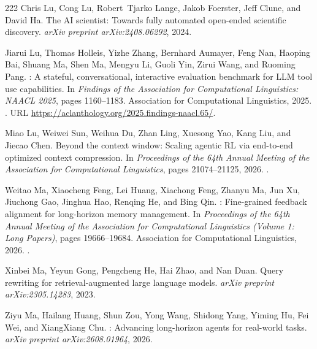 \begin{thebibliography}{222}
Chris Lu, Cong Lu, Robert~Tjarko Lange, Jakob Foerster, Jeff Clune, and David
  Ha.
\newblock The {AI} scientist: Towards fully automated open-ended scientific
  discovery.
\newblock \emph{arXiv preprint arXiv:2408.06292}, 2024.

Jiarui Lu, Thomas Holleis, Yizhe Zhang, Bernhard Aumayer, Feng Nan, Haoping
  Bai, Shuang Ma, Shen Ma, Mengyu Li, Guoli Yin, Zirui Wang, and Ruoming Pang.
: A stateful, conversational, interactive evaluation
  benchmark for {LLM} tool use capabilities.
\newblock In \emph{Findings of the Association for Computational Linguistics:
  NAACL 2025}, pages 1160--1183. Association for Computational Linguistics,
  2025.
\newblock {}.
\newblock URL \url{https://aclanthology.org/2025.findings-naacl.65/}.

Miao Lu, Weiwei Sun, Weihua Du, Zhan Ling, Xuesong Yao, Kang Liu, and Jiecao
  Chen.
\newblock Beyond the context window: Scaling agentic {RL} via end-to-end
  optimized context compression.
\newblock In \emph{Proceedings of the 64th Annual Meeting of the Association
  for Computational Linguistics}, pages 21074--21125, 2026.
\newblock {}.

Weitao Ma, Xiaocheng Feng, Lei Huang, Xiachong Feng, Zhanyu Ma, Jun Xu,
  Jiuchong Gao, Jinghua Hao, Renqing He, and Bing Qin.
: Fine-grained feedback alignment for long-horizon memory
  management.
\newblock In \emph{Proceedings of the 64th Annual Meeting of the Association
  for Computational Linguistics (Volume 1: Long Papers)}, pages 19666--19684.
  Association for Computational Linguistics, 2026{}.
\newblock {}.

Xinbei Ma, Yeyun Gong, Pengcheng He, Hai Zhao, and Nan Duan.
\newblock Query rewriting for retrieval-augmented large language models.
\newblock \emph{arXiv preprint arXiv:2305.14283}, 2023.

Ziyu Ma, Hailang Huang, Shun Zou, Yong Wang, Shidong Yang, Yiming Hu, Fei Wei,
  and XiangXiang Chu.
: Advancing long-horizon agents for real-world
  tasks.
\newblock \emph{arXiv preprint arXiv:2608.01964}, 2026{}.


\end{thebibliography}
